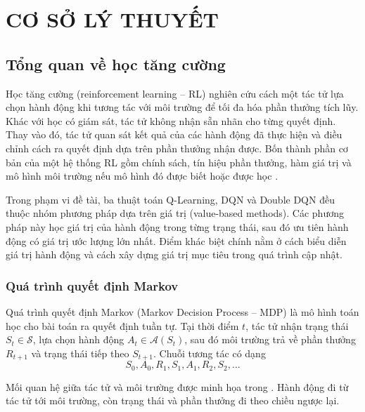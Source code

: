 \section{CƠ SỞ LÝ THUYẾT}

\subsection{Tổng quan về học tăng cường}

Học tăng cường (reinforcement learning -- RL) nghiên cứu cách một tác tử lựa chọn hành động khi tương tác với môi trường để tối đa hóa phần thưởng tích lũy. Khác với học có giám sát, tác tử không nhận sẵn nhãn cho từng quyết định. Thay vào đó, tác tử quan sát kết quả của các hành động đã thực hiện và điều chỉnh cách ra quyết định dựa trên phần thưởng nhận được. Bốn thành phần cơ bản của một hệ thống RL gồm chính sách, tín hiệu phần thưởng, hàm giá trị và mô hình môi trường nếu mô hình đó được biết hoặc được học \cite{SuttonBarto2018,TranDinhTanAICourse}.

Trong phạm vi đề tài, ba thuật toán Q-Learning, DQN và Double DQN đều thuộc nhóm phương pháp dựa trên giá trị (value-based methods). Các phương pháp này học giá trị của hành động trong từng trạng thái, sau đó ưu tiên hành động có giá trị ước lượng lớn nhất. Điểm khác biệt chính nằm ở cách biểu diễn giá trị hành động và cách xây dựng giá trị mục tiêu trong quá trình cập nhật.

\subsubsection{Quá trình quyết định Markov}

Quá trình quyết định Markov (Markov Decision Process -- MDP) là mô hình toán học cho bài toán ra quyết định tuần tự. Tại thời điểm $t$, tác tử nhận trạng thái $S_t \in \mathcal{S}$, lựa chọn hành động $A_t \in \mathcal{A}(S_t)$, sau đó môi trường trả về phần thưởng $R_{t+1}$ và trạng thái tiếp theo $S_{t+1}$. Chuỗi tương tác có dạng
\begin{equation}
    S_0, A_0, R_1, S_1, A_1, R_2, S_2, \ldots
    \label{eq:mdp-trajectory}
\end{equation}

Mối quan hệ giữa tác tử và môi trường được minh họa trong . Hành động đi từ tác tử tới môi trường, còn trạng thái và phần thưởng đi theo chiều ngược lại.

